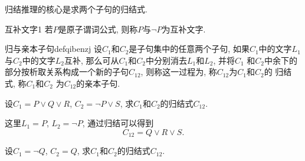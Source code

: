 归结推理的核心是求两个子句的归结式.
\begin{mydef}{互补文字}{1}
    若$P$是原子谓词公式, 则称$P$与$\neg P$为互补文字.
\end{mydef}
\begin{mydef}{归与亲本子句}{defqibenzj}
    设$C_1$和$C_2$是子句集中的任意两个子句, 如果$C_1$中的文字$L_1$与$C_2$中的文字$L_2$互补, 那么可从$C_1$和$C_2$中分别消去$L_1$和$L_2$, 并将$C_1$ 和$C_2$中余下的部分按析取关系构成一个新的子句$C_{12}$, 则称这一过程为, 称$C_{12}$为$C_1$和$C_2$的
   归结式, 称$C_1$和$C_2$ 为$C_{1 2}$的亲本子句.
\end{mydef}
\begin{example}
    设$C_1 =P\vee Q\vee R$, $C_2=\neg P\vee S$, 求$C_1$和$C_2$的归结式$C_{12}$.
\end{example}
\begin{result}
这里$L_1=P$, $L_2=\neg P$, 通过归结可以得到
             $$C_{12}= Q\vee R\vee S.$$
\begin{example}
  设$C_1=\neg Q$, $C_2=Q$, 求$C_1$和$C_2$的归结式$C_{12}$.
\end{example}
\end{result}
